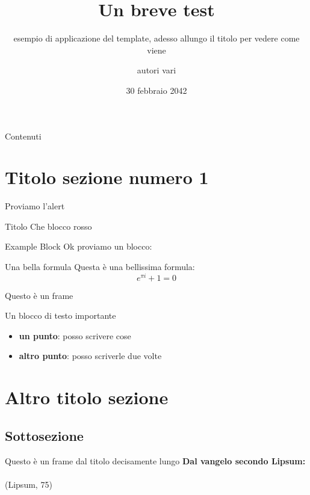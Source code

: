 \documentclass{beamer}
\title{Un breve test}
\subtitle{esempio di applicazione del template, adesso allungo il titolo per vedere come viene}
\author{autori vari}
\institute{Università di Trento}
\date{30 febbraio 2042}
\begin{document}

\begin{frame}
  \titlepage
\end{frame}

\begin{frame}{Contenuti}
  \tableofcontents
\end{frame}

\section{Titolo sezione numero 1}

\begin{frame}
	Proviamo l'\alert{alert}
	\pause
	\begin{alertblock}{Titolo}
	Che blocco rosso
	\end{alertblock}
\end{frame}


\begin{frame}{Example Block}
	Ok proviamo un blocco:
	\begin{exampleblock}{Una bella formula}
		Questa è una bellissima formula:
		\[ e^{\pi i} + 1 = 0\]
	\end{exampleblock}
\end{frame}

\begin{frame}{Questo è un frame}
    \begin{block}{Un blocco di testo importante}
        \lipsum[66]
    \end{block}
    \pause
    \begin{itemize}
      \item \textbf{un punto}: posso scrivere cose
      \pause
      \item \textbf{altro punto}: posso scriverle due volte
    \end{itemize}
\end{frame}

\section{Altro titolo sezione}
\subsection{Sottosezione}
\begin{frame}{Questo è un frame dal titolo decisamente lungo}
    \textbf{Dal vangelo secondo Lipsum:} \\
    \pause
    \textit{\lipsum[75]} \\ 
    (Lipsum, 75)
\end{frame}
\end{document}
